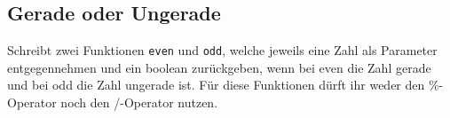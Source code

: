 \subsection{Gerade oder Ungerade }
Schreibt zwei Funktionen \texttt{even} und \texttt{odd}, welche jeweils eine Zahl
als Parameter entgegennehmen und ein boolean zurückgeben, wenn bei even die Zahl
gerade und bei odd die Zahl ungerade ist. Für diese Funktionen dürft ihr weder den \%-Operator noch den /-Operator nutzen.
